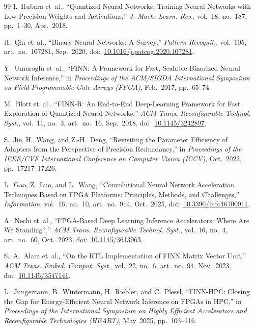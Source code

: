 \documentclass[journal]{IEEEtran}
\begin{document}
\begin{thebibliography}{99}
I.~Hubara et~al.,
``Quantized Neural Networks: Training Neural Networks with Low Precision Weights and Activations,''
\emph{J. Mach. Learn. Res.}, vol.~18, no.~187, pp.~1--30, Apr.~2018.

H.~Qin et~al.,
``Binary Neural Networks: A Survey,''
\emph{Pattern Recognit.}, vol.~105, art.~no.~107281, Sep.~2020,
doi:~\url{10.1016/j.patcog.2020.107281}.


Y.~Umuroglu et~al.,
``FINN: A Framework for Fast, Scalable Binarized Neural Network Inference,''
in \emph{Proceedings of the ACM/SIGDA International Symposium on Field-Programmable Gate Arrays (FPGA)}, Feb.~2017, pp.~65--74.


M.~Blott et~al.,
``FINN-R: An End-to-End Deep-Learning Framework for Fast Exploration of Quantized Neural Networks,''
\emph{ACM Trans. Reconfigurable Technol. Syst.}, vol.~11, no.~3, art.~no.~16, Sep.~2018,
doi:~\url{10.1145/3242897}.

S.~Jie, H.~Wang, and Z.-H.~Deng,
``Revisiting the Parameter Efficiency of Adapters from the Perspective of Precision Redundancy,''
in \emph{Proceedings of the IEEE/CVF International Conference on Computer Vision (ICCV)}, Oct.~2023, pp.~17217--17226.

L.~Gao, Z.~Luo, and L.~Wang,
``Convolutional Neural Network Acceleration Techniques Based on FPGA Platforms: Principles, Methods, and Challenges,''
\emph{Information}, vol.~16, no.~10, art.~no.~914, Oct.~2025,
doi:~\url{10.3390/info16100914}.

A.~Nechi et~al.,
``FPGA-Based Deep Learning Inference Accelerators: Where Are We Standing?,''
\emph{ACM Trans. Reconfigurable Technol. Syst.}, vol.~16, no.~4, art.~no.~60, Oct.~2023,
doi:~\url{10.1145/3613963}.

S.~A.~Alam et~al.,
``On the RTL Implementation of FINN Matrix Vector Unit,''
\emph{ACM Trans. Embed. Comput. Syst.}, vol.~22, no.~6, art.~no.~94, Nov.~2023,
doi:~\url{10.1145/3547141}.

L.~Jungemann, B.~Wintermann, H.~Riebler, and C.~Plessl,
``FINN-HPC: Closing the Gap for Energy-Efficient Neural Network Inference on FPGAs in HPC,''
in \emph{Proceedings of the International Symposium on Highly Efficient Accelerators and Reconfigurable Technologies (HEART)}, May~2025, pp.~103--116.


\end{thebibliography}
\end{document}

